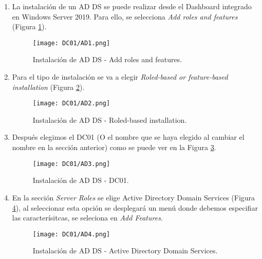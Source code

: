 \begin{enumerate}

\item La instalación de un AD DS se puede realizar desde el Dashboard integrado en Windows Server 2019. Para ello, se selecciona {\it Add roles and features} (Figura \ref{DC01-AD1}).
\begin{figure}[H] %
\begin{center}
\texttt{[image: DC01/AD1.png]}
\end{center}
\caption{Instalación de AD DS - Add roles and features.}
\label{DC01-AD1}
\end{figure}


\item Para el tipo de instalación se va a elegir {\it Roled-based or feature-based installation} (Figura \ref{DC01-AD2}).
\begin{figure}[H] %
\begin{center}
\texttt{[image: DC01/AD2.png]}
\end{center}
\caption{Instalación de AD DS - Roled-based installation.}
\label{DC01-AD2}
\end{figure}


\item Después elegimos el DC01 (O el nombre que se haya elegido al cambiar el nombre en la sección anterior) como se puede ver en la Figura \ref{DC01-AD3}.
\begin{figure}[H] %
\begin{center}
\texttt{[image: DC01/AD3.png]}
\end{center}
\caption{Instalación de AD DS - DC01.}
\label{DC01-AD3}
\end{figure}


\item En la sección {\it Server Roles} se elige Active Directory Domain Services (Figura \ref{DC01-AD4}), al seleccionar esta opción se desplegará un menú donde debemos especifiar las caracterísitcas, se seleciona en {\it Add Features}.
\begin{figure}[H] %
\begin{center}
\texttt{[image: DC01/AD4.png]}
\end{center}
\caption{Instalación de AD DS - Active Directory Domain Services.}
\label{DC01-AD4}
\end{figure}



\end{enumerate}
